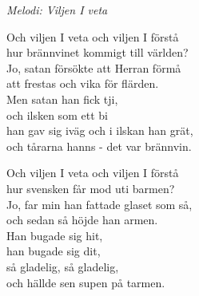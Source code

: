 {\footnotesize\textit{Melodi: Viljen I veta}}\par
\vspace{10pt}
Och viljen I veta och viljen I förstå\\
hur brännvinet kommigt till världen?\\
Jo, satan försökte att Herran förmå\\
att frestas och vika för flärden.\\
Men satan han fick tji,\\
och ilsken som ett bi\\
han gav sig iväg och i ilskan han grät,\\
och tårarna hanns - det var brännvin.\par
\vspace{10pt}
Och viljen I veta och viljen I förstå\\
hur svensken får mod uti barmen?\\
Jo, far min han fattade glaset som så,\\
och sedan så höjde han armen.\\
Han bugade sig hit,\\
han bugade sig dit,\\
så gladelig, så gladelig,\\
och hällde sen supen på tarmen.
